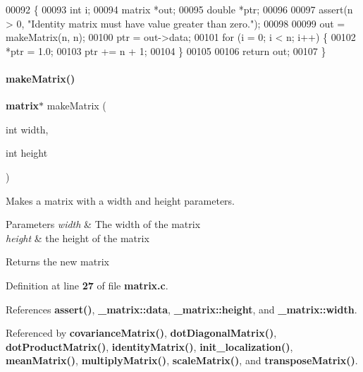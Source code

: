\begin{DoxyCode}
00092                               \{
00093   \textcolor{keywordtype}{int} i;
00094   matrix *out;
00095   \textcolor{keywordtype}{double} *ptr;
00096 
00097   assert(n > 0, \textcolor{stringliteral}{"Identity matrix must have value greater than zero."});
00098 
00099   out = makeMatrix(n, n);
00100   ptr = out->data;
00101   \textcolor{keywordflow}{for} (i = 0; i < n; i++) \{
00102     *ptr = 1.0;
00103     ptr += n + 1;
00104   \}
00105 
00106   \textcolor{keywordflow}{return} out;
00107 \}
\end{DoxyCode}
\mbox{\label{a00041_aae8b56c6fb44d9147b835f4006ca872c}} 
\paragraph{make\+Matrix()}
{\footnotesize\ttfamily \textbf{ matrix}$\ast$ make\+Matrix (\begin{DoxyParamCaption}\item[{int}]{width,  }\item[{int}]{height }\end{DoxyParamCaption})}



Makes a matrix with a width and height parameters. 


\begin{DoxyParams}{Parameters}
{\em width} & The width of the matrix \\
\hline
{\em height} & the height of the matrix \\
\hline
\end{DoxyParams}
\begin{DoxyReturn}{Returns}
the new matrix 
\end{DoxyReturn}


Definition at line \textbf{ 27} of file \textbf{ matrix.\+c}.



References \textbf{ assert()}, \textbf{ \+\_\+matrix\+::data}, \textbf{ \+\_\+matrix\+::height}, and \textbf{ \+\_\+matrix\+::width}.



Referenced by \textbf{ covariance\+Matrix()}, \textbf{ dot\+Diagonal\+Matrix()}, \textbf{ dot\+Product\+Matrix()}, \textbf{ identity\+Matrix()}, \textbf{ init\+\_\+localization()}, \textbf{ mean\+Matrix()}, \textbf{ multiply\+Matrix()}, \textbf{ scale\+Matrix()}, and \textbf{ transpose\+Matrix()}.


